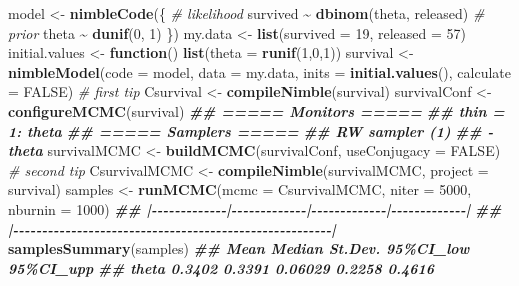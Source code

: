 \documentclass[
  12pt,
]{krantz}
\newenvironment{Shaded}{\begin{snugshade}}{\end{snugshade}}
\newcommand{\AttributeTok}[1]{\textcolor[rgb]{0.13,0.29,0.53}{#1}}
\newcommand{\CommentTok}[1]{\textcolor[rgb]{0.56,0.35,0.01}{\textit{#1}}}
\newcommand{\ConstantTok}[1]{\textcolor[rgb]{0.56,0.35,0.01}{#1}}
\newcommand{\ControlFlowTok}[1]{\textcolor[rgb]{0.13,0.29,0.53}{\textbf{#1}}}
\newcommand{\DecValTok}[1]{\textcolor[rgb]{0.00,0.00,0.81}{#1}}
\newcommand{\DocumentationTok}[1]{\textcolor[rgb]{0.56,0.35,0.01}{\textbf{\textit{#1}}}}
\newcommand{\FunctionTok}[1]{\textcolor[rgb]{0.13,0.29,0.53}{\textbf{#1}}}
\newcommand{\NormalTok}[1]{#1}
\newcommand{\OtherTok}[1]{\textcolor[rgb]{0.56,0.35,0.01}{#1}}
\newcommand{\SpecialCharTok}[1]{\textcolor[rgb]{0.81,0.36,0.00}{\textbf{#1}}}
\begin{document}
\begin{Shaded}
\begin{Highlighting}[]
\NormalTok{model }\OtherTok{\textless{}{-}} \FunctionTok{nimbleCode}\NormalTok{(\{}
  \CommentTok{\# likelihood}
\NormalTok{  survived }\SpecialCharTok{\textasciitilde{}} \FunctionTok{dbinom}\NormalTok{(theta, released)}
  \CommentTok{\# prior}
\NormalTok{  theta }\SpecialCharTok{\textasciitilde{}} \FunctionTok{dunif}\NormalTok{(}\DecValTok{0}\NormalTok{, }\DecValTok{1}\NormalTok{)}
\NormalTok{\})}
\NormalTok{my.data }\OtherTok{\textless{}{-}} \FunctionTok{list}\NormalTok{(}\AttributeTok{survived =} \DecValTok{19}\NormalTok{, }\AttributeTok{released =} \DecValTok{57}\NormalTok{)}
\NormalTok{initial.values }\OtherTok{\textless{}{-}} \ControlFlowTok{function}\NormalTok{() }\FunctionTok{list}\NormalTok{(}\AttributeTok{theta =} \FunctionTok{runif}\NormalTok{(}\DecValTok{1}\NormalTok{,}\DecValTok{0}\NormalTok{,}\DecValTok{1}\NormalTok{))}
\NormalTok{survival }\OtherTok{\textless{}{-}} \FunctionTok{nimbleModel}\NormalTok{(}\AttributeTok{code =}\NormalTok{ model, }
                        \AttributeTok{data =}\NormalTok{ my.data, }
                        \AttributeTok{inits =} \FunctionTok{initial.values}\NormalTok{(),}
                        \AttributeTok{calculate =} \ConstantTok{FALSE}\NormalTok{) }\CommentTok{\# first tip}
\NormalTok{Csurvival }\OtherTok{\textless{}{-}} \FunctionTok{compileNimble}\NormalTok{(survival)}
\NormalTok{survivalConf }\OtherTok{\textless{}{-}} \FunctionTok{configureMCMC}\NormalTok{(survival)}
\DocumentationTok{\#\# ===== Monitors =====}
\DocumentationTok{\#\# thin = 1: theta}
\DocumentationTok{\#\# ===== Samplers =====}
\DocumentationTok{\#\# RW sampler (1)}
\DocumentationTok{\#\#   {-} theta}
\NormalTok{survivalMCMC }\OtherTok{\textless{}{-}} \FunctionTok{buildMCMC}\NormalTok{(survivalConf, }\AttributeTok{useConjugacy =} \ConstantTok{FALSE}\NormalTok{) }\CommentTok{\# second tip}
\NormalTok{CsurvivalMCMC }\OtherTok{\textless{}{-}} \FunctionTok{compileNimble}\NormalTok{(survivalMCMC, }
                               \AttributeTok{project =}\NormalTok{ survival)}
\NormalTok{samples }\OtherTok{\textless{}{-}} \FunctionTok{runMCMC}\NormalTok{(}\AttributeTok{mcmc =}\NormalTok{ CsurvivalMCMC, }
                   \AttributeTok{niter =} \DecValTok{5000}\NormalTok{, }
                   \AttributeTok{nburnin =} \DecValTok{1000}\NormalTok{)}
\DocumentationTok{\#\# |{-}{-}{-}{-}{-}{-}{-}{-}{-}{-}{-}{-}{-}|{-}{-}{-}{-}{-}{-}{-}{-}{-}{-}{-}{-}{-}|{-}{-}{-}{-}{-}{-}{-}{-}{-}{-}{-}{-}{-}|{-}{-}{-}{-}{-}{-}{-}{-}{-}{-}{-}{-}{-}|}
\DocumentationTok{\#\# |{-}{-}{-}{-}{-}{-}{-}{-}{-}{-}{-}{-}{-}{-}{-}{-}{-}{-}{-}{-}{-}{-}{-}{-}{-}{-}{-}{-}{-}{-}{-}{-}{-}{-}{-}{-}{-}{-}{-}{-}{-}{-}{-}{-}{-}{-}{-}{-}{-}{-}{-}{-}{-}{-}{-}|}
\FunctionTok{samplesSummary}\NormalTok{(samples)}
\DocumentationTok{\#\#         Mean Median St.Dev. 95\%CI\_low 95\%CI\_upp}
\DocumentationTok{\#\# theta 0.3402 0.3391 0.06029    0.2258    0.4616}
\end{Highlighting}
\end{Shaded}
\end{document}
